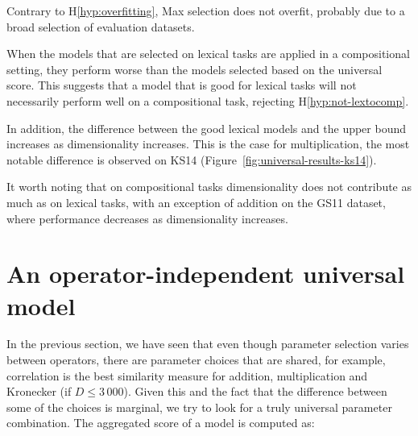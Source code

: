 Contrary to H\ref{hyp:overfitting}, Max selection does not overfit, probably due to a broad selection of evaluation datasets.

When the models that are selected on lexical tasks are applied in a compositional setting, they perform worse than the models selected based on the universal score. This suggests that a model that is good for lexical tasks will not necessarily perform well on a compositional task, rejecting H\ref{hyp:not-lextocomp}.

In addition, the difference between the good lexical models and the upper bound increases as dimensionality increases. This is the case for multiplication, the most notable difference is observed on KS14 (Figure~\ref{fig:universal-results-ks14}).

It worth noting that on compositional tasks dimensionality does not contribute as much as on lexical tasks, with an exception of addition on the GS11 dataset, where performance decreases as dimensionality increases.

\section{An operator-independent universal model}
\label{sec:single}

In the previous section, we have seen that even though parameter selection varies between operators, there are parameter choices that are shared, for example, correlation is the best similarity measure for addition, multiplication and Kronecker (if $D \le 3\,000$). Given this and the fact that the difference between some of the choices is marginal, we try to look for a truly universal parameter combination. The aggregated score of a model is computed as:

